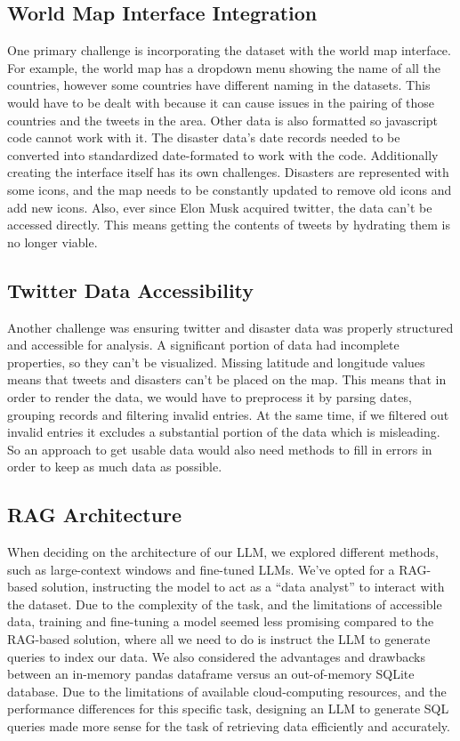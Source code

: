 \documentclass[pdflatex,sn-mathphys-num]{sn-jnl}%
\theoremstyle{thmstyleone}%
\theoremstyle{thmstyletwo}%
\theoremstyle{thmstylethree}%
\begin{document}
\subsection{World Map Interface Integration}\label{subsec4}
One primary challenge is incorporating the dataset with the world map interface. For example, the world map has a dropdown menu showing the name of all the countries, however some countries have different naming in the datasets. This would have to be dealt with because it can cause issues in the pairing of those countries and the tweets in the area. Other data is also formatted so javascript code cannot work with it. The disaster data’s date records needed to be converted into standardized date-formated to work with the code. Additionally creating the interface itself has its own challenges. Disasters are represented with some icons, and the map needs to be constantly updated to remove old icons and add new icons. Also, ever since Elon Musk acquired twitter, the data can’t be accessed directly. This means getting the contents of tweets by hydrating them is no longer viable.
\subsection{Twitter Data Accessibility}\label{subsec5}
Another challenge was ensuring twitter and disaster data was properly structured and accessible for analysis. A significant portion of data had incomplete properties, so they can’t be visualized. Missing latitude and longitude values means that tweets and disasters can’t be placed on the map. This means that in order to render the data, we would have to preprocess it by parsing dates, grouping records and filtering invalid entries. At the same time, if we filtered out invalid entries it excludes a substantial portion of the data which is misleading. So an approach to get usable data would also need methods to fill in errors in order to keep as much data as possible.
\subsection{RAG Architecture}\label{subsec6}
When deciding on the architecture of our LLM, we explored different methods, such as large-context windows and fine-tuned LLMs. We’ve opted for a RAG-based solution, instructing the model to act as a “data analyst” to interact with the dataset. Due to the complexity of the task, and the limitations of accessible data, training and fine-tuning a model seemed less promising compared to the RAG-based solution, where all we need to do is instruct the LLM to generate queries to index our data. We also considered the advantages and drawbacks between an in-memory pandas dataframe versus an out-of-memory SQLite database. Due to the limitations of available cloud-computing resources, and the performance differences for this specific task, designing an LLM to generate SQL queries made more sense for the task of retrieving data efficiently and accurately.
\end{document}
